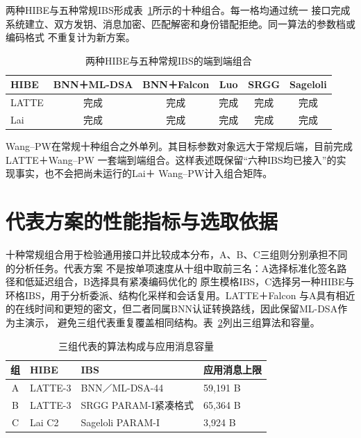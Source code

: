 两种HIBE与五种常规IBS形成表~\ref{tab:implemented-matrix}所示的十种组合。每一格均通过统一
接口完成系统建立、双方发钥、消息加密、匹配解密和身份错配拒绝。同一算法的参数档或编码格式
不重复计为新方案。

\begin{table}[H]
\centering\small
\caption{两种HIBE与五种常规IBS的端到端组合}
\label{tab:implemented-matrix}
\begin{tabular}{@{}lccccc@{}}
\toprule
\rowcolor{black!8} HIBE & BNN＋ML-DSA & BNN＋Falcon & Luo & SRGG & Sageloli \\
\midrule
LATTE & 完成 & 完成 & 完成 & 完成 & 完成 \\
Lai & 完成 & 完成 & 完成 & 完成 & 完成 \\
\bottomrule
\end{tabular}
\end{table}

Wang--PW在常规十种组合之外单列。其目标参数对象远大于常规后端，目前完成LATTE＋Wang--PW
一套端到端组合。这样表述既保留“六种IBS均已接入”的实现事实，也不会把尚未运行的Lai＋
Wang--PW计入组合矩阵。

\section{代表方案的性能指标与选取依据}

十种常规组合用于检验通用接口并比较成本分布，A、B、C三组则分别承担不同的分析任务。代表方案
不是按单项速度从十组中取前三名：A选择标准化签名路径和低延迟组合，B选择具有紧凑编码优化的
原生模格IBS，C选择另一种HIBE与环格IBS，用于分析委派、结构化采样和会话复用。LATTE＋Falcon
与A具有相近的在线时间和更短的密文，但二者同属BNN认证转换路线，因此保留ML-DSA作为主演示，
避免三组代表重复覆盖相同结构。表~\ref{tab:representatives}列出三组算法和容量。

\begin{table}[H]
\centering\small
\caption{三组代表的算法构成与应用消息容量}
\label{tab:representatives}
\begin{tabularx}{\textwidth}{@{}cp{}Xp{}@{}}
\toprule
\rowcolor{black!8} 组 & HIBE & IBS & 应用消息上限 \\
\midrule
A & LATTE-3 & BNN／ML-DSA-44 & 59,191 B \\
B & LATTE-3 & SRGG PARAM-I紧凑格式 & 65,364 B \\
C & Lai C2 & Sageloli PARAM-I & 3,924 B \\
\bottomrule
\end{tabularx}
\end{table}

